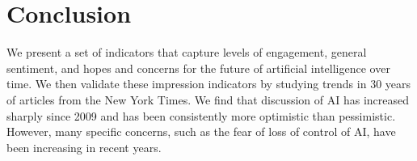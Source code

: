 \documentclass[letterpaper]{article}
\begin{document}
\section{Conclusion}
We present a set of indicators that capture levels of engagement, general sentiment, and hopes and concerns for the future of artificial intelligence over time. We then validate these impression indicators by studying trends in 30 years of articles from the New York Times. We find that discussion of AI has increased sharply since 2009 and has been consistently more optimistic than pessimistic. However, many specific concerns, such as the fear of loss of control of AI, have been increasing in recent years.
\end{document}
